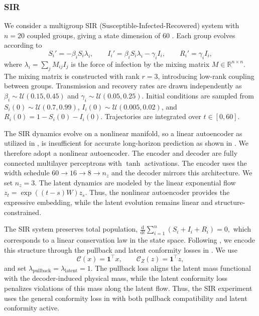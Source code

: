 \documentclass[a4paper,fleqn]{cas-sc}
\theoremstyle{thmstyleone}%
\theoremstyle{thmstyletwo}%
\theoremstyle{thmstylethree}%
\begin{document}
\subsubsection{SIR}
\label{sec:sir}

We consider a multigroup SIR (Susceptible-Infected-Recovered) system with $n=20$ coupled groups, giving a state dimension of $60$ \cite{hethcote2000mathematics}. Each group evolves according to
\[
    S_i' = -\beta_i S_i \lambda_i, \qquad
    I_i' = \beta_i S_i \lambda_i - \gamma_i I_i, \qquad
    R_i' = \gamma_i I_i,
\]
where $\lambda_i = \sum_j M_{ij} I_j$ is the force of infection by the mixing matrix $M \in \mathbb{R}^{n\times n}$. The mixing matrix is constructed with rank $r = 3$, introducing low-rank coupling between groups. Transmission and recovery rates are drawn independently as $\beta_i \sim \mathcal{U}(0.15, 0.45)$ and $\gamma_i \sim \mathcal{U}(0.05, 0.25)$. Initial conditions are sampled from $S_i(0) \sim \mathcal{U}(0.7, 0.99)$, $I_i(0) \sim \mathcal{U}(0.005, 0.02)$, and $R_i(0) = 1 - S_i(0) - I_i(0)$. Trajectories are integrated over $t \in [0, 60]$.

The SIR dynamics evolve on a nonlinear manifold, so a linear autoencoder as utilized in , is insufficient for accurate long-horizon prediction as shown in . We therefore adopt a nonlinear autoencoder. The encoder and decoder are fully connected multilayer perceptrons with $\tanh$ activations. The encoder uses the width schedule $60 \to 16 \rightarrow 8 \rightarrow n_z$  and the decoder mirrors this architecture. We set $n_z=3$. The latent dynamics are modeled by the linear exponential flow $z_t = \exp((t-s)W)z_s$. Thus, the nonlinear autoencoder provides the expressive embedding, while the latent evolution remains linear and structure-constrained.

The SIR system preserves total population, $\frac{\mathrm d}{\mathrm dt} \sum_{i=1}^n (S_i+I_i+R_i)=0,$ which corresponds to a linear conservation law in the state space. Following , we encode this structure through the pullback and latent conformity losses in . We use
\[
    \mathcal C(x)=\mathbf 1^\top x, \qquad \mathcal C_Z(z)=\mathbf 1^\top z,
\]
and set $\lambda_{\mathrm{pullback}}=\lambda_{\mathrm{latent}}=1$. The pullback loss aligns the latent mass functional with the decoder-induced physical mass, while the latent conformity loss penalizes violations of this mass along the latent flow. Thus, the SIR experiment uses the general conformity loss in  with both pullback compatibility and latent conformity active.
\end{document}
